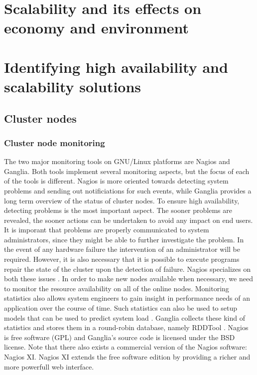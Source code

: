 \documentclass[12pt]{report}
\begin{document}
\chapter{Scalability and its effects on economy and environment}

\chapter{Identifying high availability and scalability solutions}
\section{Cluster nodes}
\subsection{Cluster node monitoring}
The two major monitoring tools on GNU/Linux platforms are Nagios and
Ganglia. Both tools implement several monitoring aspects, but the
focus of each of the tools is different. Nagios is more oriented
towards detecting system problems and sending out notificiations for
such events, while Ganglia provides a long term overview of the status
of cluster nodes. To ensure high availability, detecting problems is
the most important aspect. The sooner problems are revealed, the
sooner actions can be undertaken to avoid any impact on end users. It
is imporant that problems are properly communicated to system
administrators, since they might be able to further investigate the
problem. In the event of any hardware failure the intervention of
an administrator will be required. However, it is also necessary that
 it is possible to execute programs repair the state of the cluster
 upon the detection of failure. Nagios specializes on both these
 issues \cite{nagios:2013}.
In order to make new nodes available when necessary, we need to
monitor the resource availability on all of the online nodes.
Monitoring statistics also allows system engineers to gain insight in
performance needs of an application over the course of time. 
Such statistics can also be used to setup models that can be used to
predict system load \cite{andreolini:2006}. Ganglia collects these
kind of statistics and stores them in a round-robin database, namely RDDTool
\cite{ganglia:2013} \cite{rrdt:2013}.
Nagios is free software (GPL) and Ganglia's source code is licensed
under the BSD license. Note that there also exists a commercial
version of the Nagios software: Nagios XI. Nagios XI extends the free
software edition by providing a richer and more powerfull web interface.
\end{document}
